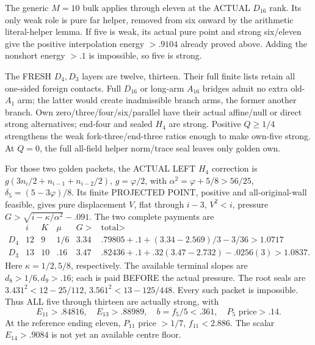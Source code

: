 \documentclass[11pt]{article}
\begin{document}
The generic \(M=10\) bulk applies through
eleven at the ACTUAL \(D_{16}\) rank.
Its only weak role is pure far helper,
removed from six onward by the arithmetic
literal-helper lemma.
If five is weak, its actual pure point
and strong six/eleven give the positive
interpolation energy \(>.9104\) already
proved above.
Adding the nonshort energy \(>.1\)
is impossible, so five is strong.

The FRESH \(D_4,D_3\) layers are twelve,
thirteen.
Their full finite lists retain all
one-sided foreign contacts.
Full \(D_{16}\) or long-arm \(A_{16}\)
bridges admit no extra old-\(A_1\) arm;
the latter would create inadmissible
branch arms, the former another branch.
Own zero/three/four/six/parallel have
their actual affine/null or direct
strong alternatives; end-four and sealed
\(H_4\) are strong.
Positive \(Q\ge1/4\) strengthens the weak
fork-three/end-three ratios enough to
make own-five strong.
At \(Q=0\), the full all-field helper
norm/trace seal leaves only golden own.

For those two golden packets, the ACTUAL
LEFT \(H_4\) correction is
\(g(3n_i/2+n_{i-1}+n_{i-2}/2)\),
\(g=\varphi/2\), with
\(\alpha^2=\varphi+5/8>56/25\),
\(\delta_5=(5-3\varphi)/8\).
Its finite PROJECTED POINT, positive and
all-original-wall feasible, gives pure
displacement \(V\), flat through \(i-3\),
\(V^2<i\), pressure
\(G>\sqrt{i-\kappa/\alpha^2}-.091\).
The two complete payments are
\[
\begin{array}{c|c|c|c|c|c}
 &i&K&\mu&G>&\text{total}>\\ \hline
 D_4&12&9&1/6&3.34&
 .79805+.1+(3.34-2.569)/3-3/36>1.0717\\
 D_3&13&10&.16&3.47&
 .82436+.1+.32(3.47-2.732)-.0256(3)>1.0837 .
\end{array}
\]
Here \(\kappa=1/2,5/8\), respectively.
The available terminal slopes are
\(d_8>1/6,d_9>.16\); each is paid
BEFORE the actual pressure.
The root seals are
\(3.431^2<12-25/112\),
\(3.561^2<13-125/448\).
Every such packet is impossible.
Thus ALL five through thirteen are
actually strong, with
\[
 E_{11}>.84816,\quad E_{13}>.88989,\quad
 b=f_5/5<.361,\quad P_5\text{ price}>.14 .
\]
At the reference ending eleven,
\(P_{11}\) price \(>1/7\), \(f_{11}<2.886\).
The scalar \(E_{14}>.9084\) is not yet
an available centre floor.
\end{document}
